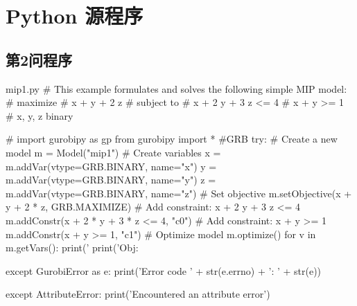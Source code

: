\section{Python 源程序}

\renewcommand{\thesubsection}{B\thinskip.\thinskip\arabic{subsection}}

\subsection{第2问程序}

\vspace{-2ex}

\begin{Python}{mip1.py}
# This example formulates and solves the following simple MIP model:
#  maximize
#        x +   y + 2 z
#  subject to
#        x + 2 y + 3 z <= 4
#        x +   y       >= 1
#        x, y, z binary

# import gurobipy as gp
from gurobipy import * #GRB
try:
    # Create a new model
    m = Model("mip1")
    # Create variables
    x = m.addVar(vtype=GRB.BINARY, name="x")
    y = m.addVar(vtype=GRB.BINARY, name="y")
    z = m.addVar(vtype=GRB.BINARY, name="z")
    # Set objective
    m.setObjective(x + y + 2 * z, GRB.MAXIMIZE)
    # Add constraint: x + 2 y + 3 z <= 4
    m.addConstr(x + 2 * y + 3 * z <= 4, "c0")
    # Add constraint: x + y >= 1
    m.addConstr(x + y >= 1, "c1")
    # Optimize model
    m.optimize()
    for v in m.getVars():
        print('%
    print('Obj: %

except GurobiError as e:
    print('Error code ' + str(e.errno) + ': ' + str(e))

except AttributeError:
    print('Encountered an attribute error')
\end{Python}
